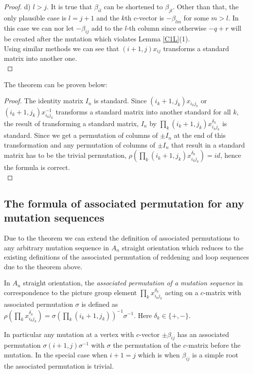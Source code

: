 \begin{proof}
\indent d) $l>j$. It is true that $\beta_{il}$ can be shortened to $\beta_{jl}$. Other than that, the only plausible case is $l = j + 1$ and the $k$th c-vector is $-\beta_{lm}$ for some $m>l$. In this case we can nor let $-\beta_{ij}$ add to the $l$-th column since otherwise $-q+r$ will be created after the mutation which violates Lemma \ref{C1L}(1).\\
\indent Using similar methods we can see that $(i+1, j)x_{ij}$ transforms a standard matrix into another one.\\
\end{proof}
\indent The theorem can be proven below:\\
\begin{proof}
The identity matrix $I_n$ is standard. Since $(i_k+1,j_k)x_{i_kj_k}$ or $(i_k+1,j_k)x_{i_kj_k}^{-1}$ transforms a standard matrix into another standard for all $k$, the result of transforming a standard matrix, $I_n$ by $\prod_{k}(i_k+1,j_k)x_{i_kj_k}^{\delta_k}$ is standard. Since we get a permutation of columns of $\pm I_n$ at the end of this transformation and any permutation of columns of $\pm I_n$ that result in a standard matrix has to be the trivial permutation, $\rho(\prod_{k}(i_k+1,j_k)x_{i_kj_k}^{\delta_k})=id$, hence the formula is correct.\\
\end{proof}
\subsection{The formula of associated permutation for any mutation sequences}
\indent Due to the theorem we can extend the definition of associated permutations to any arbitrary mutation sequence in $A_n$ straight orientation which reduces to the existing definitions of the associated permutation of reddening and loop sequences due to the theorem above.
\begin{definition}
In $A_n$ straight orientation, the \textit{associated permutation of a mutation sequence} in correspondence to the picture group element $\prod_{k}x_{i_kj_k}^{\delta_k}$ acting on a $c$-matrix with associated permutation $\sigma$ is defined as $\rho(\prod_{k}x_{i_kj_k}^{\delta_k}) = \sigma(\prod_{k}(i_k+1,j_k))^{-1}\sigma^{-1}$. Here $\delta_k\in\{+,-\}$.\\
\end{definition}
\indent In particular any mutation at a vertex with $c$-vector $\pm\beta_{ij}$ has an associated permutation $\sigma(i+1,j)\sigma^{-1}$ with $\sigma$ the permutation of the $c$-matrix before the mutation. In the special case when $i+1=j$ which is when $\beta_{ij}$ is a simple root the associated permutation is trivial.\\ 